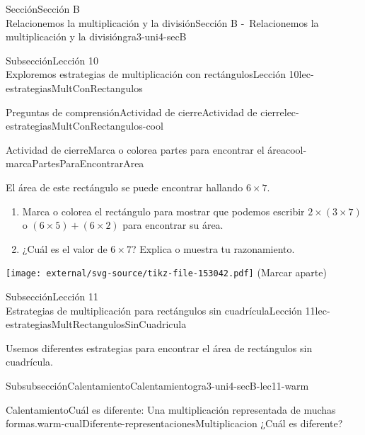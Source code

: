\begin{sectionptx}{Sección}{{\Large Sección B\\}Relacionemos la multiplicación y la división}{}{Sección B -~Relacionemos la multiplicación y la división}{}{}{gra3-uni4-secB}
\begin{subsectionptx}{Subsección}{{\normalsize Lección 10\\[-0.05cm]}Exploremos estrategias de multiplicación con rectángulos}{}{Lección 10}{}{}{lec-estrategiasMultConRectangulos}
\begin{reading-questions-subsubsection}{Preguntas de comprensión}{Actividad de cierre}{}{Actividad de cierre}{}{}{lec-estrategiasMultConRectangulos-cool}
\begin{project}{Actividad de cierre}{Marca o colorea partes para encontrar el área}{cool-marcaPartesParaEncontrarArea}%
\begin{sidebyside}{2}{0.0}{0.0}{0.1}%
\begin{sbspanel}{0.75}%
El área de este rectángulo se puede encontrar hallando \(6 \times 7\).%
%
\begin{enumerate}[label={(\alph*)}]
\item{}Marca o colorea el rectángulo para mostrar que podemos escribir \(2 \times (3 \times 7)\) o \((6 \times 5) + (6 \times 2)\) para encontrar su área.%
\item{}¿Cuál es el valor de \(6 \times 7\)? Explica o muestra tu razonamiento.%
\end{enumerate}
\end{sbspanel}%
\begin{sbspanel}{0.1}%
\texttt{[image: external/svg-source/tikz-file-153042.pdf]}
(Marcar aparte)
\end{sbspanel}%
\end{sidebyside}%
\end{project}%
\end{reading-questions-subsubsection}
\end{subsectionptx}
%
%
\typeout{************************************************}
\typeout{************************************************}
%
\begin{subsectionptx}{Subsección}{{\normalsize Lección 11\\[-0.05cm]}Estrategias de multiplicación para rectángulos sin cuadrícula}{}{Lección 11}{}{}{lec-estrategiasMultRectangulosSinCuadricula}
\begin{introduction}{}%
Usemos diferentes estrategias para encontrar el área de rectángulos sin cuadrícula.%
\end{introduction}%
%
%
\typeout{************************************************}
\typeout{************************************************}
%
\begin{subsubsectionptx}{Subsubsección}{Calentamiento}{}{Calentamiento}{}{}{gra3-uni4-secB-lec11-warm}
\begin{exploration}{Calentamiento}{Cuál es diferente: Una multiplicación representada de muchas formas.}{warm-cualDiferente-representacionesMultiplicacion}%
¿Cuál es diferente?%

\end{exploration}
\end{subsubsectionptx}
\end{subsectionptx}
\end{sectionptx}
